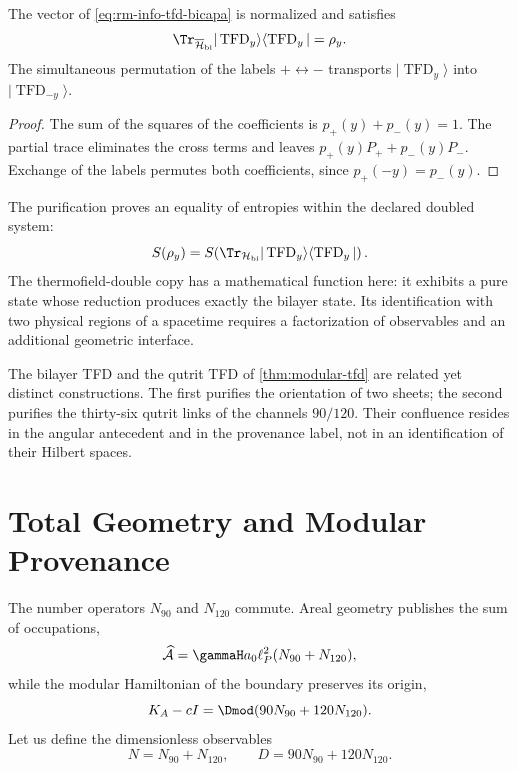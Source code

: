 \begin{proposition}
\label{prop:rm-info-tfd-bicapa}
The vector of \cref{eq:rm-info-tfd-bicapa} is normalized and satisfies
\begin{equation}
 \Tr_{\overline{\mathcal H}_{\rm bi}}
 |\operatorname{TFD}_y\rangle
 \langle\operatorname{TFD}_y|
 =\rho_y.
 \label{eq:rm-info-tfd-partial}
\end{equation}
The simultaneous permutation of the labels \(+\leftrightarrow-\)
transports \(|\operatorname{TFD}_y\rangle\) into
\(|\operatorname{TFD}_{-y}\rangle\).
\end{proposition}

\begin{proof}
The sum of the squares of the coefficients is \(p_+(y)+p_-(y)=1\). The partial
trace eliminates the cross terms and leaves \(p_+(y)P_++p_-(y)P_-\).
Exchange of the labels permutes both coefficients, since \(p_+(-y)=p_-(y)\).
\end{proof}

The purification proves an equality of entropies within the declared
doubled system:
\begin{equation}
 S(\rho_y)
 =S\!\left(
 \Tr_{\mathcal H_{\rm bi}}
 |\operatorname{TFD}_y\rangle
 \langle\operatorname{TFD}_y|
 \right).
 \label{eq:rm-info-tfd-entropy}
\end{equation}
The thermofield-double copy has a mathematical function here: it exhibits a pure state whose reduction produces exactly the bilayer state. Its identification with two physical regions of a spacetime requires a factorization of observables and an additional geometric interface.

The bilayer TFD and the qutrit TFD of
\cref{thm:modular-tfd} are related yet distinct constructions. The
first purifies the orientation of two sheets; the second purifies the
thirty-six qutrit links of the channels \(90/120\). Their confluence
resides in the angular antecedent and in the provenance label,
not in an identification of their Hilbert spaces.

\section{Total Geometry and Modular Provenance}

The number operators \(N_{90}\) and \(N_{120}\) commute. Areal geometry
publishes the sum of occupations,
\begin{equation}
 \widehat{\mathcal A}
 =\gammaH a_0\ell_P^2(N_{90}+N_{120}),
 \label{eq:rm-info-area-total}
\end{equation}
while the modular Hamiltonian of the boundary preserves its origin,
\begin{equation}
 K_A-cI
 =\Dmod(90N_{90}+120N_{120}).
 \label{eq:rm-info-hhm-provenance}
\end{equation}
Let us define the dimensionless observables
\begin{equation}
 N=N_{90}+N_{120},
 \qquad
 D=90N_{90}+120N_{120}.
 \label{eq:rm-info-ND}
\end{equation}

